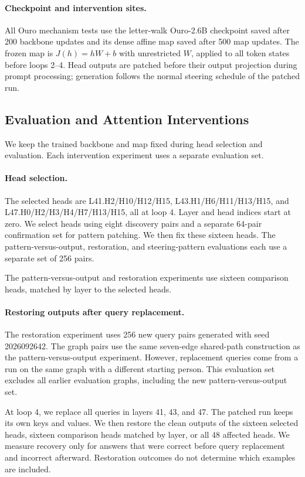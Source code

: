 \documentclass{article}
\begin{document}
\paragraph{Checkpoint and intervention sites.}
All Ouro mechanism tests use the letter-walk Ouro-2.6B checkpoint saved after 200 backbone updates and its dense affine map saved after 500 map updates. The frozen map is $J(h)=hW+b$ with unrestricted $W$, applied to all token states before loops 2--4. Head outputs are patched before their output projection during prompt processing; generation follows the normal steering schedule of the patched run.

\subsection{Evaluation and Attention Interventions}
\label{app:ouro-evaluation}
We keep the trained backbone and map fixed during head selection and evaluation. Each intervention experiment uses a separate evaluation set.

\paragraph{Head selection.}
The selected heads are L41.H2/H10/H12/H15, L43.H1/H6/H11/H13/H15, and L47.H0/H2/H3/H4/H7/H13/H15, all at loop 4. Layer and head indices start at zero. We select heads using eight discovery pairs and a separate 64-pair confirmation set for pattern patching. We then fix these sixteen heads. The pattern-versus-output, restoration, and steering-pattern evaluations each use a separate set of 256 pairs.

The pattern-versus-output and restoration experiments use sixteen comparison heads, matched by layer to the selected heads.

\paragraph{Restoring outputs after query replacement.}
The restoration experiment uses 256 new query pairs generated with seed 2026092642. The graph pairs use the same seven-edge shared-path construction as the pattern-versus-output experiment. However, replacement queries come from a run on the same graph with a different starting person. This evaluation set excludes all earlier evaluation graphs, including the new pattern-versus-output set.

At loop 4, we replace all queries in layers 41, 43, and 47. The patched run keeps its own keys and values. We then restore the clean outputs of the sixteen selected heads, sixteen comparison heads matched by layer, or all 48 affected heads. We measure recovery only for answers that were correct before query replacement and incorrect afterward. Restoration outcomes do not determine which examples are included.
\end{document}
